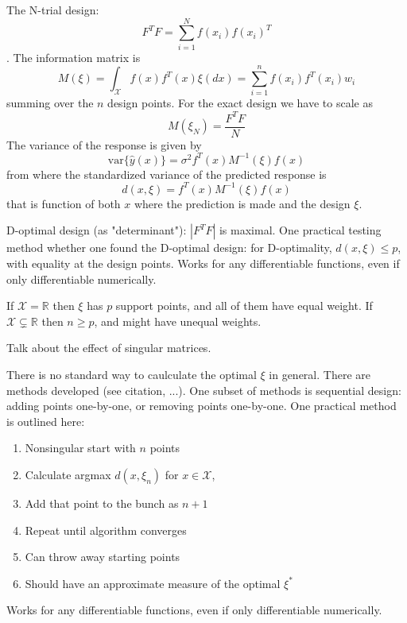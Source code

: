 \documentclass[12pt]{iopart}
\begin{document}
The N-trial design:
\begin{equation}
F^T F = \sum_{i=1}^N f(x_i) f(x_i)^T
\end{equation}.
The information matrix is
\begin{equation}
M(\xi) = \int_{\mathcal{X}} f(x)f^T(x) \xi(dx) = \sum_{i=1}^n f(x_i)f^T(x_i)w_i
\label{eq:infcont}
\end{equation}
summing over the $n$ design points.
For the exact design we have to scale as
\begin{equation}
M(\xi_N) = \frac{F^T F}{N}
\end{equation}
The variance of the response is given by
\begin{equation}
\mathrm{var}\{\hat y(x)\} = \sigma^2 f^T(x) M^{-1}(\xi) f(x)
\end{equation}
from where the standardized variance of the predicted response is
\begin{equation}
d(x, \xi) = f^T(x) M^{-1}(\xi) f(x)
\end{equation}
that is function of both $x$ where the prediction is made and the design $\xi$.

D-optimal design (as "determinant"): $|F^T F|$ is maximal.
One practical testing method whether one found the D-optimal design: for D-optimality, $d(x, \xi) \leq p$, with equality at the design points.
Works for any differentiable functions, even if only differentiable numerically.

If $\mathcal{X} = \mathbb{R}$ then $\xi$ has $p$ support points, and all of them have equal weight. If $\mathcal{X} \subsetneq \mathbb{R}$ then $n \geq p$, and might have unequal weights.

Talk about the effect of singular matrices.

There is no standard way to caulculate the optimal $\xi$ in general. There are methods developed (see citation, ...). One subset of methods is sequential design: adding points one-by-one, or removing points one-by-one. One practical method is outlined here:

\begin{enumerate}
\item Nonsingular start with $n$ points
\item Calculate argmax $d(x, \xi_n)$ for $x \in \mathcal{X}$,
\item Add that point to the bunch as $n+1$
\item Repeat until algorithm converges
\item Can throw away starting points
\item Should have an approximate measure of the optimal $\xi^*$
\end{enumerate}
Works for any differentiable functions, even if only differentiable numerically.
\end{document}
